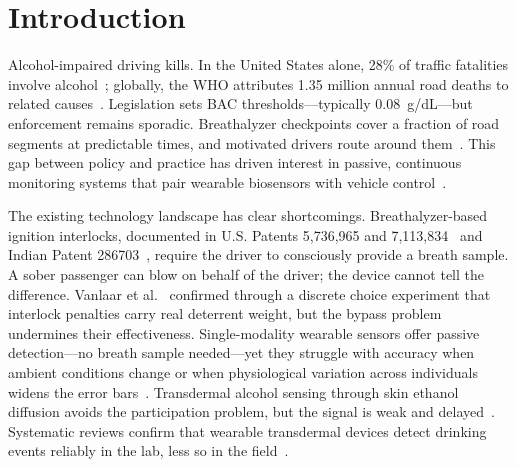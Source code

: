 \documentclass[HARVARD,Times2COL]{WileyNJDv5}
\begin{document}




\maketitle

\renewcommand\thefootnote{}

\renewcommand\thefootnote{\fnsymbol{footnote}}
\setcounter{footnote}{1}

\section{Introduction}\label{sec1}

Alcohol-impaired driving kills. In the United States alone, 28\% of traffic fatalities involve alcohol~\citep{nhtsa2022}; globally, the WHO attributes 1.35 million annual road deaths to related causes~\citep{who2018}. Legislation sets BAC thresholds---typically 0.08~g/dL---but enforcement remains sporadic. Breathalyzer checkpoints cover a fraction of road segments at predictable times, and motivated drivers route around them~\citep{das2023, lombardo2020l}. This gap between policy and practice has driven interest in passive, continuous monitoring systems that pair wearable biosensors with vehicle control~\citep{watchover}.

The existing technology landscape has clear shortcomings. Breathalyzer-based ignition interlocks, documented in U.S. Patents 5,736,965 and 7,113,834~\citep{uspat5736965, uspat7113834} and Indian Patent 286703~\citep{inpat286703}, require the driver to consciously provide a breath sample. A sober passenger can blow on behalf of the driver; the device cannot tell the difference. Vanlaar et al.~\citep{interlock2024} confirmed through a discrete choice experiment that interlock penalties carry real deterrent weight, but the bypass problem undermines their effectiveness. Single-modality wearable sensors offer passive detection---no breath sample needed---yet they struggle with accuracy when ambient conditions change or when physiological variation across individuals widens the error bars~\citep{bush2024development}. Transdermal alcohol sensing through skin ethanol diffusion avoids the participation problem, but the signal is weak and delayed~\citep{fairbairn2021, fairbairn2025}. Systematic reviews confirm that wearable transdermal devices detect drinking events reliably in the lab, less so in the field~\citep{wang2022jmir, tay2023}.
\end{document}
